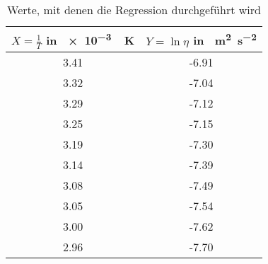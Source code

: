 \begin{table}[h!]
\centering
\begin{tabular}{c|c}
	$X=\frac{1}{T}$ in \SI{e-3}{\per\kelvin} & $Y=\ln\eta$ in \si{\ln\metre\squared\per\second\squared} \\
	\hline
	3.41 & -6.91 \\
	3.32 & -7.04 \\
	3.29 & -7.12 \\
	3.25 & -7.15 \\
	3.19 & -7.30 \\
	3.14 & -7.39 \\
	3.08 & -7.49 \\
	3.05 & -7.54 \\
	3.00 & -7.62 \\
	2.96 & -7.70
\end{tabular}
\caption{Werte, mit denen die Regression durchgeführt wird}
\label{fig:DatenRegression}
\end{table}
